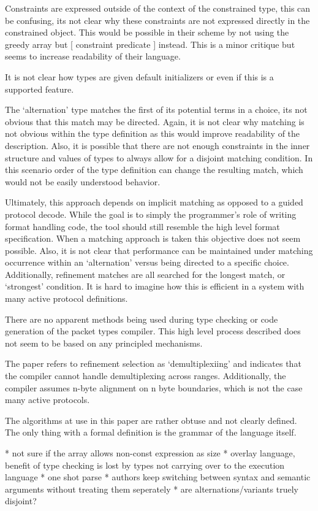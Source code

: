 Constraints are expressed outside of the context of the constrained type,
this can be confusing, its not clear why these constraints are not expressed
directly in the constrained object. This would be possible in their scheme
by not using the greedy array but [ constraint predicate ] instead. This is
a minor critique but seems to increase readability of their language.

It is not clear how types are given default initializers or even if this is
a supported feature.

The `alternation' type matches the first of its potential terms in a choice,
its not obvious that this match may be directed. Again, it is not clear why
matching is not obvious within the type definition as this would improve
readability of the description. Also, it is possible that there are not enough
constraints in the inner structure and values of types to always allow for
a disjoint matching condition. In this scenario order of the type definition
can change the resulting match, which would not be easily understood behavior.

Ultimately, this approach depends on implicit matching as opposed to a guided
protocol decode. While the goal is to simply the programmer's role of writing
format handling code, the tool should still resemble the high level
format specification. When a matching approach is taken this objective does not
seem possible. Also, it is not clear that performance can be maintained under
matching occurrence within an `alternation' versus being directed to a specific
choice. Additionally, refinement matches are all searched for the longest match,
or `strongest' condition. It is hard to imagine how this is efficient in a 
system with many active protocol definitions.

There are no apparent methods being used during type checking or code generation
of the packet types compiler. This high level process described does not seem
to be based on any principled mechanisms.

The paper refers to refinement selection as `demultiplexiing' and indicates that
the compiler cannot handle demultiplexing across ranges. Additionally, the
compiler assumes n-byte alignment on n byte boundaries, which is not the case
many active protocols.

The algorithms at use in this paper are rather obtuse and not clearly defined. 
The only thing with a formal definition is the grammar of the language itself.

* not sure if the array allows non-const expression as size
* overlay language, benefit of type checking is lost by types
  not carrying over to the execution language
* one shot parse
* authors keep switching between syntax and semantic arguments
  without treating them seperately
* are alternations/variants truely disjoint?
